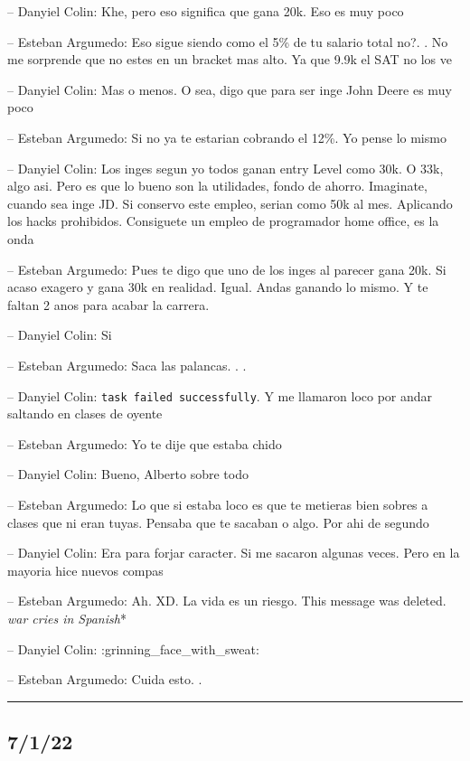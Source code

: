 -- Danyiel Colin: Khe, pero eso significa que gana 20k. Eso es muy poco

-- Esteban Argumedo: Eso sigue siendo como el 5\% de tu salario total
no?. . No me sorprende que no estes en un bracket mas alto. Ya que 9.9k
el SAT no los ve

-- Danyiel Colin: Mas o menos. O sea, digo que para ser inge John Deere
es muy poco

-- Esteban Argumedo: Si no ya te estarian cobrando el 12\%. Yo pense lo
mismo

-- Danyiel Colin: Los inges segun yo todos ganan entry Level como 30k. O
33k, algo asi. Pero es que lo bueno son la utilidades, fondo de ahorro.
Imaginate, cuando sea inge JD. Si conservo este empleo, serian como 50k
al mes. Aplicando los hacks prohibidos. Consiguete un empleo de
programador home office, es la onda

-- Esteban Argumedo: Pues te digo que uno de los inges al parecer gana
20k. Si acaso exagero y gana 30k en realidad. Igual. Andas ganando lo
mismo. Y te faltan 2 anos para acabar la carrera.

-- Danyiel Colin: Si

-- Esteban Argumedo: Saca las palancas. . .

-- Danyiel Colin: \texttt{task\ failed\ successfully}. Y me llamaron
loco por andar saltando en clases de oyente

-- Esteban Argumedo: Yo te dije que estaba chido

-- Danyiel Colin: Bueno, Alberto sobre todo

-- Esteban Argumedo: Lo que si estaba loco es que te metieras bien
sobres a clases que ni eran tuyas. Pensaba que te sacaban o algo. Por
ahi de segundo

-- Danyiel Colin: Era para forjar caracter. Si me sacaron algunas veces.
Pero en la mayoria hice nuevos compas

-- Esteban Argumedo: Ah. XD. La vida es un riesgo. This message was
deleted. \emph{war cries in Spanish}*

-- Danyiel Colin: :grinning\_face\_with\_sweat:

-- Esteban Argumedo: Cuida esto. .

\begin{center}\rule{0.5\linewidth}{0.5pt}\end{center}

\hypertarget{section-114}{%
\subsection{7/1/22}\label{section-114}}

